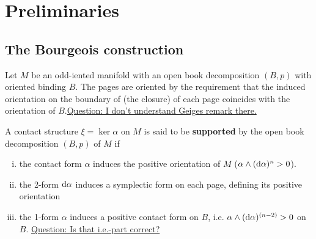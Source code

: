 \section*{Preliminaries}
\subsection*{The Bourgeois construction}


\begin{definition}\label{def:support}
    Let $M$ be an odd-iented manifold with an open book decomposition $(B,p)$ with oriented binding $B$.
    The pages are oriented by the requirement that the induced orientation on the boundary of (the closure) of each page coincides with the orientation of $B$.\underline{Question: I don't understand Geiges remark there.}

    A contact structure $\xi = \ker \alpha$ on $M$ is said to be \textbf{supported} by the open book decomposition $(B,p)$ of $M$ if
    \begin{enumerate}[(i)]
        \item the contact form $\alpha$ induces the positive orientation of $M$ ($\alpha \wedge (\mathrm{d} \alpha)^n > 0$).
        \item the 2-form $\mathrm{d} \alpha$ induces a symplectic form on each page, defining its positive orientation
        \item the 1-form $\alpha$ induces a positive contact form on $B$, i.e. $\alpha \wedge (\mathrm{d} \alpha)^{(n-2)} > 0$ on $B$. \underline{Question: Is that i.e.-part correct?}
    \end{enumerate}
\end{definition}

